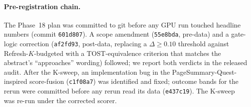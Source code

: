 \documentclass{article}
\begin{document}
\paragraph{Pre-registration chain.} The Phase~18 plan was committed to git before any GPU run touched headline numbers (commit \texttt{601d807}). A scope amendment (\texttt{55e8bda}, pre-data) and a gate-logic correction (\texttt{af2fd93}, post-data, replacing a $\Delta\geq 0.10$ threshold against Refresh-$K$-budgeted with a TOST-equivalence criterion that matches the abstract's ``approaches'' wording) followed; we report both verdicts in the released audit. After the K-sweep, an implementation bug in the PageSummary-Quest-inspired score-fusion (\texttt{c1f08a7}) was identified and fixed; outcome bands for the rerun were committed before any rerun read its data (\texttt{e437c19}). The K-sweep was re-run under the corrected scorer.
\endgroup
\end{document}
